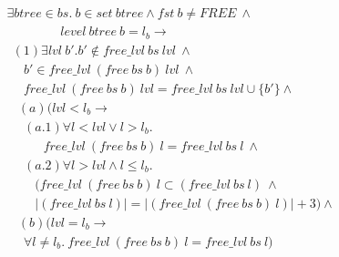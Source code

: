 \begin{lemma} 
	\label{lemma:free_deallocation}
\end{lemma}
\begin{align*}
&\exists btree \in bs.\ b \in set\ btree \wedge fst\ b \neq FREE\ \wedge\\
&\ \ \ \ \ \ \ \ \ \ \ \ \ \ \ \ \ \ \ level\ btree\ b = l_b \longrightarrow\\
&\ \ (1)\exists lvl\ b'. b' \notin free\_lvl\ bs\ lvl\ \wedge  \\
&\ \ \ \ \ \ b' \in free\_lvl\ (free\ bs\ b)\ lvl\ \wedge\\
&\ \ \ \ \ \ free\_lvl\ (free\ bs\ b)\ lvl = free\_lvl\ bs\ lvl \cup \lbrace b' \rbrace \wedge \\
& \ \ \ \ (a)(lvl < l_b \longrightarrow \\
&\ \ \ \ \ \ (a.1)\forall l < lvl \vee l > l_b.\ \\ 
&\ \ \ \ \ \ \ \ \ \ \ \ \ free\_lvl\ (free\ bs\ b)\ l = free\_lvl\ bs\ l\ \wedge\\
&\ \ \ \ \ \ (a.2)\forall l > lvl \wedge l \le l_b. \\
&\ \ \ \ \ \ \ \ \ \ (free\_lvl\ (free\ bs\ b)\ l \subset (free\_lvl\ bs\ l)\ \wedge\\
&\ \ \ \ \ \ \ \ \ \ |(free\_lvl\ bs\ l)| = |(free\_lvl\ (free\ bs\ b)\ l)| + 3) \wedge\\
& \ \ \ \ (b)(lvl = l_b \longrightarrow \\
&\ \ \ \ \ \ \forall l \ne l_b.\ free\_lvl\ (free\ bs\ b)\ l = free\_lvl\ bs\ l)
\end{align*}


%

